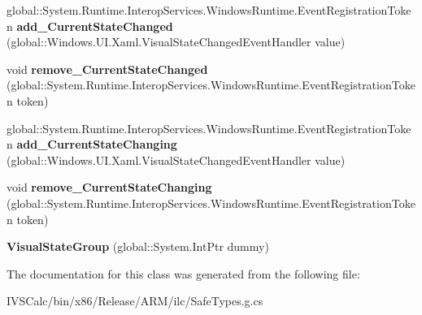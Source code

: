 \begin{DoxyCompactItemize}
\item 
\mbox{\label{class_windows_1_1_u_i_1_1_xaml_1_1_visual_state_group_ab8a602f85c6928ad4dbda31b0fc3d4fc}} 
global\+::\+System.\+Runtime.\+Interop\+Services.\+Windows\+Runtime.\+Event\+Registration\+Token {\bfseries add\+\_\+\+Current\+State\+Changed} (global\+::\+Windows.\+U\+I.\+Xaml.\+Visual\+State\+Changed\+Event\+Handler value)
\item 
\mbox{\label{class_windows_1_1_u_i_1_1_xaml_1_1_visual_state_group_a51b022e4c0673d691c79a0f52b0ca0af}} 
void {\bfseries remove\+\_\+\+Current\+State\+Changed} (global\+::\+System.\+Runtime.\+Interop\+Services.\+Windows\+Runtime.\+Event\+Registration\+Token token)
\item 
\mbox{\label{class_windows_1_1_u_i_1_1_xaml_1_1_visual_state_group_a5fad6e8105f727dac7ab1a1b62568c0a}} 
global\+::\+System.\+Runtime.\+Interop\+Services.\+Windows\+Runtime.\+Event\+Registration\+Token {\bfseries add\+\_\+\+Current\+State\+Changing} (global\+::\+Windows.\+U\+I.\+Xaml.\+Visual\+State\+Changed\+Event\+Handler value)
\item 
\mbox{\label{class_windows_1_1_u_i_1_1_xaml_1_1_visual_state_group_aa287d3d7b305f3adad8090ce145b7729}} 
void {\bfseries remove\+\_\+\+Current\+State\+Changing} (global\+::\+System.\+Runtime.\+Interop\+Services.\+Windows\+Runtime.\+Event\+Registration\+Token token)
\item 
\mbox{\label{class_windows_1_1_u_i_1_1_xaml_1_1_visual_state_group_a8f7185159b1235d9b31261ec34a8498c}} 
{\bfseries Visual\+State\+Group} (global\+::\+System.\+Int\+Ptr dummy)
\end{DoxyCompactItemize}


The documentation for this class was generated from the following file\+:\begin{DoxyCompactItemize}
\item 
I\+V\+S\+Calc/bin/x86/\+Release/\+A\+R\+M/ilc/Safe\+Types.\+g.\+cs\end{DoxyCompactItemize}
